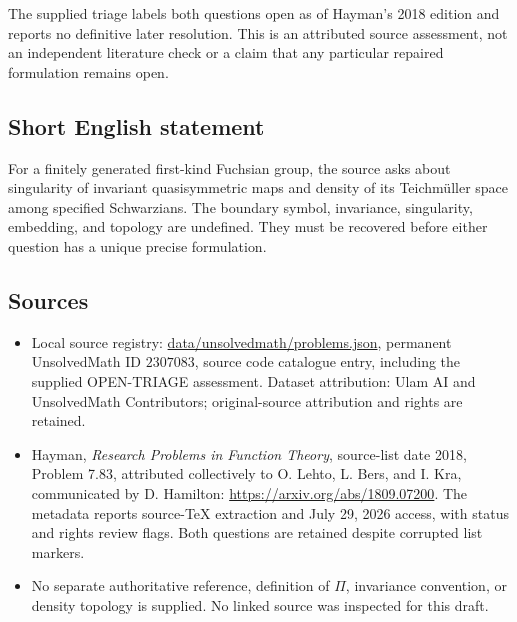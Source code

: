 \documentclass[11pt]{article}
\begin{document}
The supplied triage labels both questions open as of Hayman's 2018 edition and reports no definitive later resolution. This is an attributed source assessment, not an independent literature check or a claim that any particular repaired formulation remains open.
\subsection{Short English statement}
For a finitely generated first-kind Fuchsian group, the source asks about singularity of invariant quasisymmetric maps and density of its Teichm\"uller space among specified Schwarzians. The boundary symbol, invariance, singularity, embedding, and topology are undefined. They must be recovered before either question has a unique precise formulation.
\subsection{Sources}
\begin{itemize}
\item Local source registry: \url{data/unsolvedmath/problems.json}, permanent UnsolvedMath ID $2307083$, source code catalogue entry, including the supplied OPEN-TRIAGE assessment. Dataset attribution: Ulam AI and UnsolvedMath Contributors; original-source attribution and rights are retained.
\item Hayman, \emph{Research Problems in Function Theory}, source-list date 2018, Problem 7.83, attributed collectively to O. Lehto, L. Bers, and I. Kra, communicated by D. Hamilton: \url{https://arxiv.org/abs/1809.07200}. The metadata reports source-TeX extraction and July 29, 2026 access, with status and rights review flags. Both questions are retained despite corrupted list markers.
\item No separate authoritative reference, definition of $\Pi$, invariance convention, or density topology is supplied. No linked source was inspected for this draft.
\end{itemize}
\end{document}
